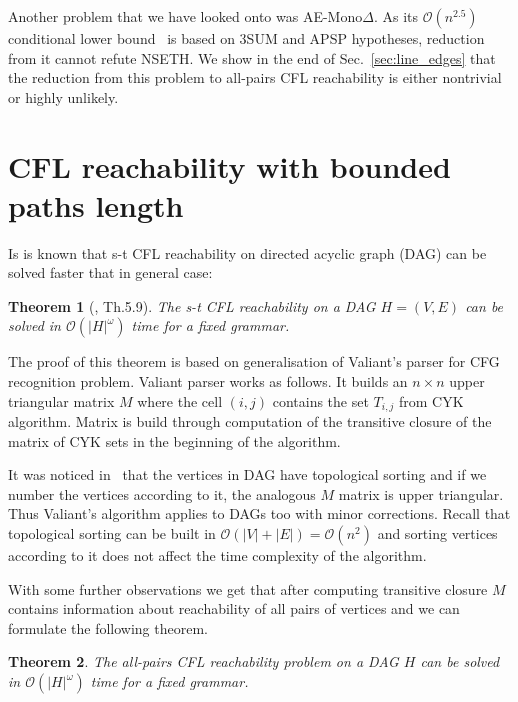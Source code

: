 \documentclass[12pt]{article}
\newtheorem{theorem}{Theorem}[section]
\begin{document}
Another problem that we have looked onto was AE-Mono$\Delta$. As its $\mathcal{O}(n^{2.5})$ conditional lower bound~\cite{https://doi.org/10.4230/lipics.itcs.2020.53} is based on 3SUM and APSP hypotheses, reduction from it cannot refute NSETH. We show in the end of Sec.~\ref{sec:line_edges} that the reduction from this problem to all-pairs CFL reachability is either nontrivial or highly unlikely.

\section{CFL reachability with bounded paths length}
\label{sec:bounded_paths}

Is is known that s-t CFL reachability on directed acyclic graph (DAG) can be solved faster that in general case:

\begin{theorem}[\cite{schepper2018complexity}, Th.5.9]
The s-t CFL reachability on a DAG $H = (V, E)$ can be solved in $\mathcal{O}(|H|^{\omega})$ time for a fixed grammar.
\end{theorem}

The proof of this theorem is based on generalisation of Valiant's parser for CFG recognition problem. Valiant parser works as follows. It builds an $n \times n$ upper triangular matrix $M$ where the cell $(i, j)$ contains the set $T_{i, j}$ from CYK algorithm. Matrix is build through computation of the transitive closure of the matrix of CYK sets in the beginning of the algorithm. 

It was noticed in~\cite{schepper2018complexity} that the vertices in DAG have topological sorting and if we number the vertices according to it, the analogous $M$ matrix is upper triangular. Thus Valiant's algorithm applies to DAGs too with minor corrections. Recall that topological sorting can be built in $\mathcal{O}(|V| + |E|) = \mathcal{O}(n^2)$ and sorting vertices according to it does not affect the time complexity of the algorithm.

With some further observations we get that after computing transitive closure $M$ contains information about reachability of all pairs of vertices and we can formulate the following theorem.

\begin{theorem}
\label{th:cflr_on_dag}
The all-pairs CFL reachability problem on a DAG $H$ can be solved in $\mathcal{O}(|H|^{\omega})$ time for a fixed grammar.
\end{theorem}
\end{document}
